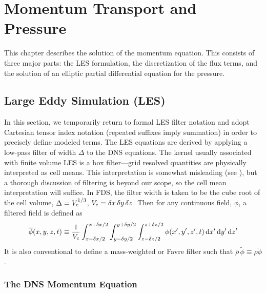 

\chapter{Momentum Transport and Pressure}
\label{momentum_chapter}

This chapter describes the solution of the momentum equation. This consists of three major parts: the LES formulation, the
discretization of the flux terms, and the solution of an elliptic partial differential equation for the pressure.

\section{Large Eddy Simulation (LES)}
\label{LES}

In this section, we temporarily return to formal LES filter notation and adopt Cartesian tensor index notation (repeated suffixes imply summation) in order to precisely define modeled terms. The LES equations are derived by applying a low-pass filter of width $\Delta$ to the DNS equations. The kernel usually associated with finite volume LES is a box filter---grid resolved quantities are physically interpreted as cell means.  This interpretation is somewhat misleading (see \cite{McDermott:2005b}), but a thorough discussion of filtering is beyond our scope, so the cell mean interpretation will suffice.  In FDS, the filter width is taken to be the cube root of the cell volume, $\Delta = V_{\rm c}^{1/3}$, $V_{\rm c} = \delta x \,\delta y\, \delta z$.  Then for any continuous field, $\phi$, a filtered field is defined as
\begin{equation}
\label{eqn_box_filter}
\overline{\phi}(x,y,z,t) \equiv \frac{1}{V_{\rm c}} \int_{x - \delta x/2}^{x + \delta x/2}\int_{y - \delta y/2}^{y + \delta y/2}\int_{z - \delta z/2}^{z + \delta z/2} \phi(x',y',z',t) \,\mbox{d} x' \,\mbox{d} y' \,\mbox{d} z'
\end{equation}
It is also conventional to define a mass-weighted or Favre filter such that $\overline{\rho}\,\widetilde{\phi} \equiv \overline{\rho \phi}$.

\subsection{The DNS Momentum Equation}

